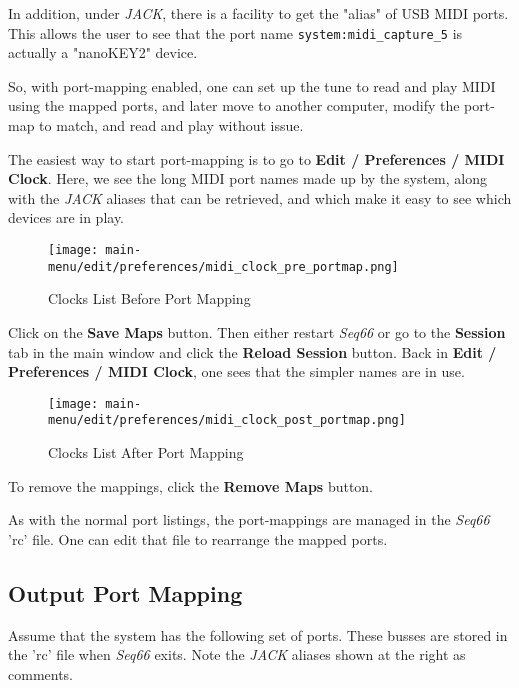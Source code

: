    In addition, under \textsl{JACK}, there is a facility to get the "alias" of
   USB MIDI ports.  This allows the user to see that the port name
   \texttt{system:midi\_capture\_5} is actually a "nanoKEY2" device.

   So, with port-mapping enabled, one can set up the tune to read and play MIDI
   using the mapped ports, and later move to another computer, modify the
   port-map to match, and read and play without issue.

   The easiest way to start port-mapping is to go to
   \textbf{Edit / Preferences / MIDI Clock}.
   Here, we see the long MIDI port names made up by the system, along
   with the \textsl{JACK} aliases that can be retrieved, and which make it easy
   to see which devices are in play.

\begin{figure}[H]
   \centering 
   \texttt{[image: main-menu/edit/preferences/midi\_clock\_pre\_portmap.png]}
   \caption{Clocks List Before Port Mapping}
   \label{fig:clocks_list_before_port_mapping}
\end{figure}

   Click on the \textbf{Save Maps} button.
   Then either restart \textsl{Seq66} or go to the \textbf{Session} tab
   in the main window and click the \textbf{Reload Session} button.
   Back in \textbf{Edit / Preferences / MIDI Clock},
   one sees that the simpler names are in use.

\begin{figure}[H]
   \centering 
   \texttt{[image: main-menu/edit/preferences/midi\_clock\_post\_portmap.png]}
   \caption{Clocks List After Port Mapping}
   \label{fig:clocks_list_after_port_mapping}
\end{figure}

   To remove the mappings, click the \textbf{Remove Maps} button.

   As with the normal port listings, the port-mappings are managed in the
   \textsl{Seq66} 'rc' file.
   One can edit that file to rearrange the mapped ports.

\subsection{Output Port Mapping}
\label{subsec:output_port_mapping}

   Assume that the system has the following set of ports.  These busses are
   stored in the 'rc' file when \textsl{Seq66} exits.  Note the \textsl{JACK}
   aliases shown at the right as comments.

